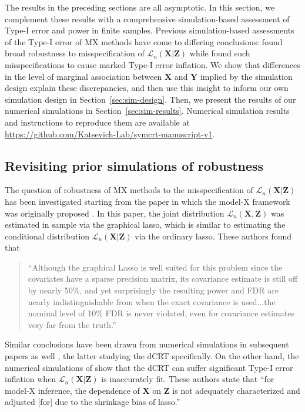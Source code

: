 \documentclass[aos]{imsart}
\theoremstyle{plain}
\theoremstyle{remark}
\newcommand{\prx}{\bm X}								%
\newcommand{\prz}{\bm Z}								%
\newcommand{\pry}{{\bm Y}}								%
\newcommand{\law}{\mathcal L}							%
\begin{document}
The results in the preceding sections are all asymptotic. In this section, we complement these results with a comprehensive simulation-based assessment of Type-I error and power in finite samples. Previous simulation-based assessments of the Type-I error of MX methods have come to differing conclusions: \citet{SetC17, Romano2019a, SetS19, Liu2022a} found broad robustness to misspecification of $\law_n(\prx|\prz)$ while \citet{Li2022} found such misspecifications to cause marked Type-I error inflation. We show that differences in the level of marginal association between $\prx$ and $\pry$ implied by the simulation design explain these discrepancies, and then use this insight to inform our own simulation design in Section~\ref{sec:sim-design}. Then, we present the results of our numerical simulations in Section~\ref{sec:sim-results}. Numerical simulation results and instructions to reproduce them are available at \url{https://github.com/Katsevich-Lab/symcrt-manuscript-v1}.	

\subsection{Revisiting prior simulations of robustness}  \label{sec:sim-revisiting}

The question of robustness of MX methods to the misspecification of $\law_n(\prx|\prz)$ has been investigated starting from the paper in which the model-X framework was originally proposed \citep{CetL16}. In this paper, the joint distribution $\law_n(\prx,\prz)$ was estimated in sample via the graphical lasso, which is similar to estimating the conditional distribution $\law_n(\prx|\prz)$ via the ordinary lasso. These authors found that
\begin{quote}
    ``Although the graphical Lasso is well suited for this problem since the covariates have a sparse precision matrix, its covariance estimate is still off by nearly 50\%, and yet surprisingly the resulting power and FDR are nearly indistinguishable from when the exact covariance is used...the nominal level of 10\% FDR is never violated, even for covariance estimates very far from the truth.''
\end{quote}
Similar conclusions have been drawn from numerical simulations in subsequent papers as well \citep{SetC17, Romano2019a, SetS19, Liu2022a}, the latter studying the dCRT specifically. On the other hand, the numerical simulations of \citet{Li2022} show that the dCRT can suffer significant Type-I error inflation when $\law_n(\prx|\prz)$ is inaccurately fit. These authors state that ``for model-X inference, the dependence of $\prx$ on $\prz$ is not adequately characterized and adjusted [for] due to the shrinkage bias of lasso.''
\end{document}
